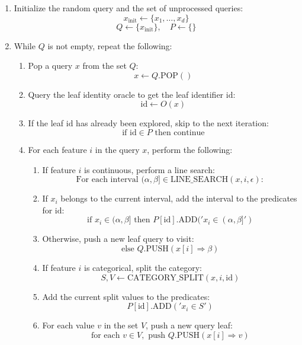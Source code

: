 \begin{enumerate}
        \item Initialize the random query and the set of unprocessed queries:
        \[
        x_{\text{init}} \leftarrow \{x_1, \ldots, x_d\}
        \]
        \[
        Q \leftarrow \{x_{\text{init}}\}, \quad P \leftarrow \{\}
        \]
        \item While $Q$ is not empty, repeat the following:
        \begin{enumerate}
            \item Pop a query $x$ from the set $Q$:
            \[
            x \leftarrow Q.\text{POP}()
            \]
            \item Query the leaf identity oracle to get the leaf identifier $\text{id}$:
            \[
            \text{id} \leftarrow O(x)
            \]
            \item If the leaf $\text{id}$ has already been explored, skip to the next iteration:
            \[
            \text{if } \text{id} \in P \text{ then continue}
            \]
            \item For each feature $i$ in the query $x$, perform the following:
            \begin{enumerate}
                \item If feature $i$ is continuous, perform a line search:
                \[
                \text{For each interval } (\alpha, \beta] \in \text{LINE\_SEARCH}(x, i, \epsilon):
                \]
                \item If $x_i$ belongs to the current interval, add the interval to the predicates for $\text{id}$:
                \[
                \text{if } x_i \in (\alpha, \beta] \text{ then } P[\text{id}].\text{ADD}('x_i \in (\alpha, \beta]')
                \]
                \item Otherwise, push a new leaf query to visit:
                \[
                \text{else } Q.\text{PUSH}(x[i] \Rightarrow \beta)
                \]
                \item If feature $i$ is categorical, split the category:
                \[
                S, V \leftarrow \text{CATEGORY\_SPLIT}(x, i, \text{id})
                \]
                \item Add the current split values to the predicates:
                \[
                P[\text{id}].\text{ADD}('x_i \in S')
                \]
                \item For each value $v$ in the set $V$, push a new query leaf:
                \[
                \text{for each } v \in V, \text{ push } Q.\text{PUSH}(x[i] \Rightarrow v)
                \]
            \end{enumerate}
        \end{enumerate}
    \end{enumerate}


